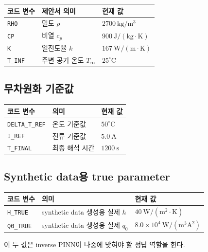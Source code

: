 \documentclass[11pt]{article}
\begin{document}
\begin{center}
\begin{tabular}{lll}
\toprule
코드 변수 & 제안서 의미 & 현재 값 \\
\midrule
\texttt{RHO} & 밀도 \(\rho\) & \(2700~\mathrm{kg/m^3}\) \\
\texttt{CP} & 비열 \(c_p\) & \(900~\mathrm{J/(kg\cdot K)}\) \\
\texttt{K} & 열전도율 \(k\) & \(167~\mathrm{W/(m\cdot K)}\) \\
\texttt{T\_INF} & 주변 공기 온도 \(T_\infty\) & \(25^\circ\mathrm{C}\) \\
\bottomrule
\end{tabular}
\end{center}

\subsection{무차원화 기준값}

\begin{center}
\begin{tabular}{lll}
\toprule
코드 변수 & 의미 & 현재 값 \\
\midrule
\texttt{DELTA\_T\_REF} & 온도 기준값 & \(50^\circ\mathrm{C}\) \\
\texttt{I\_REF} & 전류 기준값 & \(5.0~\mathrm{A}\) \\
\texttt{T\_FINAL} & 최종 해석 시간 & \(1200~\mathrm{s}\) \\
\bottomrule
\end{tabular}
\end{center}

\subsection{Synthetic data용 true parameter}

\begin{center}
\begin{tabular}{lll}
\toprule
코드 변수 & 의미 & 현재 값 \\
\midrule
\texttt{H\_TRUE} & synthetic data 생성용 실제 \(h\) & \(40~\mathrm{W/(m^2\cdot K)}\) \\
\texttt{Q0\_TRUE} & synthetic data 생성용 실제 \(q_0\) & \(8.0\times10^4~\mathrm{W/(m^3 A^2)}\) \\
\bottomrule
\end{tabular}
\end{center}

이 두 값은 inverse PINN이 나중에 맞혀야 할 정답 역할을 한다.
\end{document}
